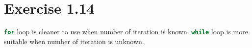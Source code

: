 \documentclass{article}
\begin{document}
\section*{Exercise 1.14}

\lstinline[language=C++]|for| loop is cleaner to use when number of iteration
is known. \lstinline[language=C++]|while| loop is more suitable when number of
iteration is unknown.
\end{document}
